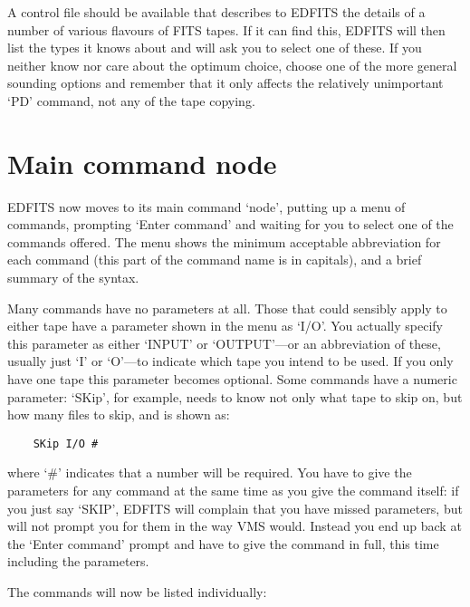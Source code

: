 A control file should be available that describes to EDFITS the details of
a number of various flavours of FITS tapes.  If it can find this, EDFITS
will then list the types it knows about and will ask you to select one of
these.  If you neither know nor care about the optimum choice, choose one of
the more general sounding options and remember that it only affects the
relatively unimportant `PD' command, not any of the tape copying.

\section{Main command node}

EDFITS now moves to its main command `node', putting up a menu of commands,
prompting `Enter command' and waiting for you to select one of the commands
offered.  The menu shows the minimum acceptable abbreviation for each command
(this part of the command name is in capitals), and a brief summary of the
syntax.

Many commands have no parameters at all.  Those that could sensibly
apply to either tape have a parameter shown in the menu as `I/O'.  You actually
specify this parameter as either `INPUT' or `OUTPUT'---or an abbreviation
of these, usually just `I' or `O'---to indicate which tape you intend to
be used.  If you only have one tape this parameter becomes optional.  Some
commands have a numeric parameter: `SKip', for example, needs to know
not only what tape to skip on, but how many files to skip, and is shown
as:
\begin{verbatim}
    SKip I/O #
\end{verbatim}
where `\#' indicates that a number will be required.  You have to give
the parameters for any command at the same time as you give the command
itself: if you just say `SKIP', EDFITS will complain that you have missed
parameters, but will not prompt you for them in the way VMS would.  Instead
you end up back at the `Enter command' prompt and have to give the command
in full, this time including the parameters.

The commands will now be listed individually:

